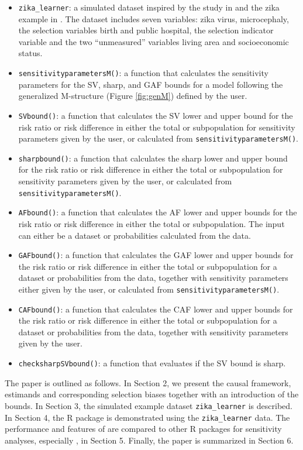 \begin{itemize}
\tightlist
\item
  \texttt{zika\_learner}: a simulated dataset inspired by the study in
  \citet{de2018association} and the zika example in \citet{smith2019bounding}. The dataset
  includes seven variables: zika virus, microcephaly, the selection variables
  birth and public hospital, the selection indicator variable and the two
  ``unmeasured'' variables living area and socioeconomic status.
\item
  \texttt{sensitivityparametersM()}: a function that calculates the sensitivity
  parameters for the SV, sharp, and GAF bounds for a model following the
  generalized M-structure (Figure \ref{fig:genM}) defined by the user.
\item
  \texttt{SVbound()}: a function that calculates the SV lower and upper bound for the
  risk ratio or risk difference in either the total or subpopulation for
  sensitivity parameters given by the user, or calculated from
  \texttt{sensitivityparametersM()}.
\item
  \texttt{sharpbound()}: a function that calculates the sharp lower and upper bound
  for the risk ratio or risk difference in either the total or subpopulation for
  sensitivity parameters given by the user, or calculated from
  \texttt{sensitivityparametersM()}.
\item
  \texttt{AFbound()}: a function that calculates the AF lower and upper bounds for
  the risk ratio or risk difference in either the total or subpopulation. The
  input can either be a dataset or probabilities calculated from the data.
\item
  \texttt{GAFbound()}: a function that calculates the GAF lower and upper bounds for
  the risk ratio or risk difference in either the total or subpopulation for
  a dataset or probabilities from the data, together with sensitivity parameters
  either given by the user, or calculated from \texttt{sensitivityparametersM()}.
\item
  \texttt{CAFbound()}: a function that calculates the CAF lower and upper bounds for
  the risk ratio or risk difference in either the total or subpopulation for
  a dataset or probabilities from the data, together with sensitivity parameters
  given by the user.
\item
  \texttt{checksharpSVbound()}: a function that evaluates if the SV bound is sharp.
\end{itemize}

The paper is outlined as follows. In Section 2, we present the causal framework,
estimands and corresponding selection biases together with an introduction of
the bounds. In Section 3, the simulated example dataset \texttt{zika\_learner} is
described. In Section 4, the R package  is demonstrated
using the \texttt{zika\_learner} data. The performance and features of
 are compared to other R packages for sensitivity
analyses, especially , in Section 5. Finally, the paper is
summarized in Section 6.

